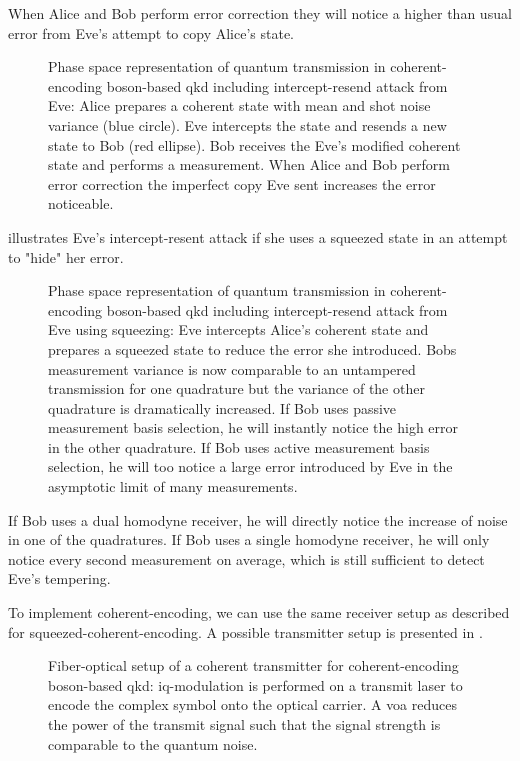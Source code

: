 When Alice and Bob perform error correction they will notice a higher than usual error from Eve's attempt to copy Alice's state.
\begin{figure}[htb]
	\centering
	
	\caption{Phase space representation of quantum transmission in coherent-encoding boson-based \gls{qkd} including intercept-resend attack from Eve: Alice prepares a coherent state with mean and shot noise variance (blue circle). Eve intercepts the state and resends a new state to Bob (red ellipse). Bob receives the Eve's modified coherent state and performs a measurement. When Alice and Bob perform error correction the imperfect copy Eve sent increases the error noticeable.}\label{fig:phase_space_intercept_resend}
\end{figure}
 illustrates Eve's intercept-resent attack if she uses a squeezed state in an attempt to "hide" her error.
\begin{figure}[htb]
	\centering
	
	\caption{Phase space representation of quantum transmission in coherent-encoding boson-based \gls{qkd} including intercept-resend attack from Eve using squeezing: Eve intercepts Alice's coherent state and prepares a squeezed state to reduce the error she introduced. Bobs measurement variance is now comparable to an untampered transmission for one quadrature but the variance of the other quadrature is dramatically increased. If Bob uses passive measurement basis selection, he will instantly notice the high error in the other quadrature. If Bob uses active measurement basis selection, he will too notice a large error introduced by Eve in the asymptotic limit of many measurements.}\label{fig:phase_space_intercept_resend_squeezed}
\end{figure}
If Bob uses a dual homodyne receiver, he will directly notice the increase of noise in one of the quadratures.
If Bob uses a single homodyne receiver, he will only notice every second measurement on average, which is still sufficient to detect Eve's tempering.

To implement coherent-encoding, we can use the same receiver setup as described for squeezed-coherent-encoding.
A possible transmitter setup is presented in \label{fig:coherent_transmitter}.
\begin{figure}[htb]
	\centering
	
	\caption{Fiber-optical setup of a coherent transmitter for coherent-encoding boson-based \gls{qkd}: \gls{iq}-modulation is performed on a transmit laser to encode the complex symbol onto the optical carrier. A \gls{voa} reduces the power of the transmit signal such that the signal strength is comparable to the quantum noise.}\label{fig:coherent_transmitter}
\end{figure}